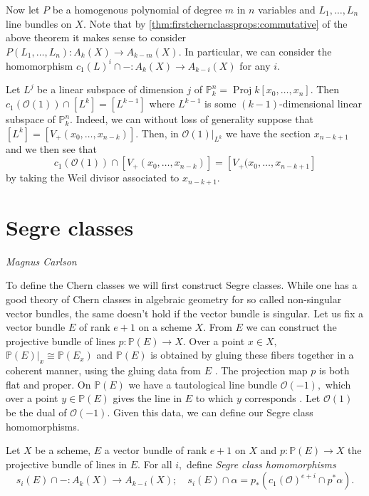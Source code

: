 \documentclass[a4paper,openany]{scrbook}
\newcommand{\chapterauthor}[1]{\hfill\emph{#1}\par\noindent}
\begin{document}
Now let $P$ be a homogenous polynomial of degree $m$ in $n$ variables and $L_1, \ldots, L_n$ line bundles on $X$. Note that by \eqref{thm:firstchernclassprops:commutative} of the above theorem it makes sense to consider $P(L_1,\ldots ,L_n) : A_k(X) \rightarrow A_{k-m}(X).$ In particular, we can consider the homomorphism $c_1(L)^i \cap -\colon A_k(X) \rightarrow A_{k-i}(X)$ for any $i.$  
\begin{example}
Let $L^j$ be a linear subspace of dimension $j$ of $\mathbb{P}^n_k = \operatorname{Proj} k[x_0,\ldots,x_n]$.   Then $c_1(\mathcal{O}(1)) \cap [L^k] = [L^{k-1}]$ where $L^{k-1}$ is some $(k-1)$-dimensional linear subspace of $\mathbb{P}^n_k.$ Indeed, we can without loss of generality suppose that $[L^k] = [V_+(x_0, \ldots, x_{n-k})].$ Then, in $\mathcal{O}(1)|_{L^k}$ we have the section $x_{n-k+1}$ and we then see that
\[
c_1(\mathcal{O}(1)) \cap [V_+(x_0,\ldots,x_{n-k})] = [V_+(x_0,\ldots,x_{n-k+1}]
\]
by taking the Weil divisor associated to $x_{n-k+1}$.
\end{example}

\section{Segre classes}
\chapterauthor{Magnus Carlson}

To define the Chern classes we will first construct Segre classes. While one has a good theory of Chern classes in algebraic geometry for so called non-singular vector bundles,  the same doesn't hold if the vector bundle is singular. Let us fix a vector bundle $E$ of rank $e+1$ on a scheme $X$. From $E$ we can construct the projective bundle of lines $p\colon \mathbb{P}(E) \rightarrow X$. Over a point $x \in X,$ $\mathbb{P}(E)|_x \cong \mathbb{P}(E_x)$ and $\mathbb{P}(E)$ is obtained by gluing these fibers together in a coherent manner, using the gluing data from $E$ . The projection map $p$ is both flat and proper. On $\mathbb{P}(E)$ we have a tautological line bundle $\mathcal{O}(-1),$ which over a point $y \in \mathbb{P}(E)$ gives the line in $E$ to which $y$ corresponds . Let $\mathcal{O}(1)$ be the dual of $\mathcal{O}(-1).$ Given this data, we can define our Segre class homomorphisms.
\begin{defn}
Let $X$ be a scheme, $E$ a vector bundle of rank $e+1$ on $X$ and $p:\mathbb{P}(E) \rightarrow X$ the projective bundle of lines in $E.$ For all $i,$ define \emph{Segre class homomorphisms}
\[
s_i(E) \cap -\colon A_k(X) \rightarrow A_{k-i}(X); \quad s_i(E) \cap \alpha = p_\ast (c_1(\mathcal{O})^{e+i} \cap p^\ast \alpha).
\]
\end{defn}
\end{document}
